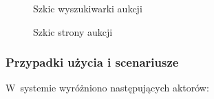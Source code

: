 \begin{figure}[h]
\centering
{}
\caption{Szkic wyszukiwarki aukcji}
\label{mock2}
\end{figure}

\begin{figure}[h]
\centering
{}
\caption{Szkic strony aukcji}
\label{mock3}
\end{figure}

\subsubsection{Przypadki użycia i scenariusze}

W~systemie wyróżniono następujących aktorów:

